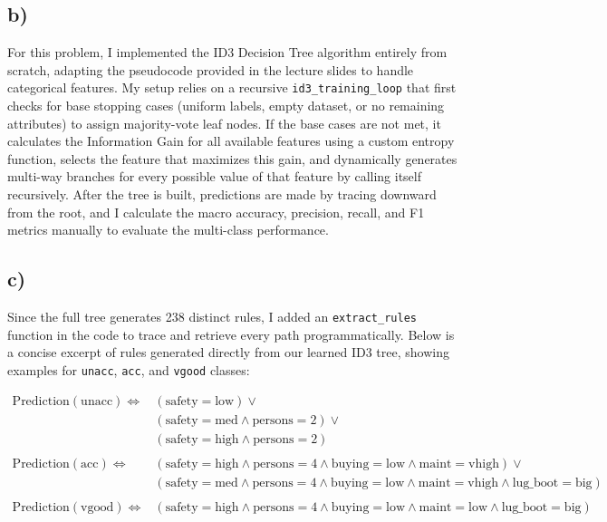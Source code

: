 \documentclass[12pt]{article}
\begin{document}
\subsection*{b)}
For this problem, I implemented the ID3 Decision Tree algorithm entirely from scratch, adapting the pseudocode provided in the lecture slides to handle categorical features. My setup relies on a recursive \texttt{id3\_training\_loop} that first checks for base stopping cases (uniform labels, empty dataset, or no remaining attributes) to assign majority-vote leaf nodes. If the base cases are not met, it calculates the Information Gain for all available features using a custom entropy function, selects the feature that maximizes this gain, and dynamically generates multi-way branches for every possible value of that feature by calling itself recursively. After the tree is built, predictions are made by tracing downward from the root, and I calculate the macro accuracy, precision, recall, and F1 metrics manually to evaluate the multi-class performance.

\subsection*{c)}

Since the full tree generates 238 distinct rules, I added an \texttt{extract\_rules} function in the code to trace and retrieve every path programmatically. Below is a concise excerpt of rules generated directly from our learned ID3 tree, showing examples for \texttt{unacc}, \texttt{acc}, and \texttt{vgood} classes:

\begin{align*}
\text{Prediction}(\text{unacc}) \iff & (\text{safety} = \text{low}) \lor \\
& (\text{safety} = \text{med} \land \text{persons} = 2) \lor \\
& (\text{safety} = \text{high} \land \text{persons} = 2) \\
\\
\text{Prediction}(\text{acc}) \iff & (\text{safety} = \text{high} \land \text{persons} = 4 \land \text{buying} = \text{low} \land \text{maint} = \text{vhigh}) \lor \\
& (\text{safety} = \text{med} \land \text{persons} = 4 \land \text{buying} = \text{low} \land \text{maint} = \text{vhigh} \land \text{lug\_boot} = \text{big}) \\
\\
\text{Prediction}(\text{vgood}) \iff & (\text{safety} = \text{high} \land \text{persons} = 4 \land \text{buying} = \text{low} \land \text{maint} = \text{low} \land \text{lug\_boot} = \text{big})
\end{align*}
\end{document}
